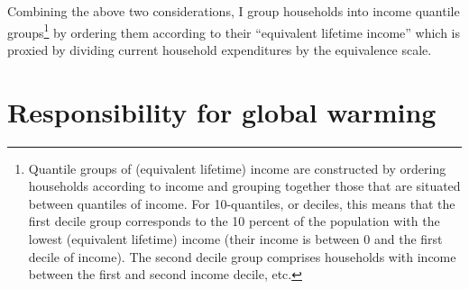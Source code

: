 \documentclass[a4paper,11pt,abstract=true]{scrartcl}
\begin{document}
Combining the above two considerations, I group households into income quantile groups\footnote{%
  Quantile groups of (equivalent lifetime) income are constructed by ordering households according to income and grouping together those that are situated between quantiles of income.
  For 10-quantiles, or deciles, this means that the first decile group corresponds to the 10 percent of the population with the lowest (equivalent lifetime) income (their income is between 0 and the first decile of income).
  The second decile group comprises households with income between the first and second income decile, etc.
}
by ordering them according to their ``equivalent lifetime income'' which is proxied by dividing current household expenditures by the equivalence scale.

\clearpage

\section{Responsibility for global warming}
\label{sec:gwp}
\end{document}

